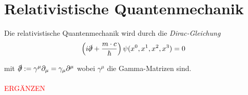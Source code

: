 \documentclass{article}
\newcommand{\lr}[1]{\left(#1\right)}
\begin{document}
\newpage


\section{Relativistische Quantenmechanik}
Die relativistische Quantenmechanik wird durch die \textit{Dirac-Gleichung}
	\begin{equation}
		\lr{ i \slashed{\partial} + \frac{m\cdot c}{\hbar}} \psi(x^0, x^1, x^2, x^3) = 0
	\end{equation}

mit $\slashed{\partial} := \gamma^\mu\partial_\mu = \gamma_\mu\partial^\mu$ wobei $\gamma^\mu$ die Gamma-Matrizen sind.\\
\\
\textcolor{red}{ERGÄNZEN}


\newpage
\end{document}
